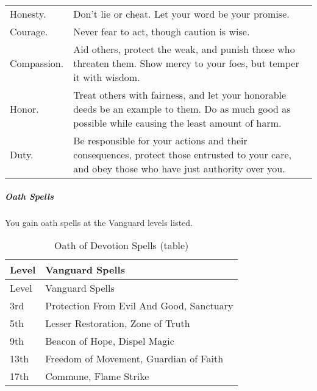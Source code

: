 \begin{longtable}[]{@{}
  >{\raggedright\arraybackslash}p{}
  >{\raggedright\arraybackslash}p{}@{}}
\toprule\noalign{}
\endhead
\bottomrule\noalign{}
\endlastfoot
Honesty. & Don't lie or cheat. Let your word be your promise. \\
Courage. & Never fear to act, though caution is wise. \\
Compassion. & Aid others, protect the weak, and punish those who
threaten them. Show mercy to your foes, but temper it with wisdom. \\
Honor. & Treat others with fairness, and let your honorable deeds be an
example to them. Do as much good as possible while causing the least
amount of harm. \\
Duty. & Be responsible for your actions and their consequences, protect
those entrusted to your care, and obey those who have just authority
over you. \\
\end{longtable}

\subparagraph{Oath Spells}\label{_oath_spells}

You gain oath spells at the Vanguard levels listed.

\begin{longtable}[]{@{}
  >{\raggedright\arraybackslash}p{}
  >{\raggedright\arraybackslash}p{}@{}}
\caption{Oath of Devotion Spells
(table)}\label{vanguard-oath-of-devotion-spells}\tabularnewline
\toprule\noalign{}
\begin{minipage}[b]{\linewidth}\raggedright
Level
\end{minipage} & \begin{minipage}[b]{\linewidth}\raggedright
Vanguard Spells
\end{minipage} \\
\midrule\noalign{}
\endfirsthead
\toprule\noalign{}
\begin{minipage}[b]{\linewidth}\raggedright
Level
\end{minipage} & \begin{minipage}[b]{\linewidth}\raggedright
Vanguard Spells
\end{minipage} \\
\midrule\noalign{}
\endhead
\bottomrule\noalign{}
\endlastfoot
3rd & Protection From Evil And Good, Sanctuary \\
5th & Lesser Restoration, Zone of Truth \\
9th & Beacon of Hope, Dispel Magic \\
13th & Freedom of Movement, Guardian of Faith \\
17th & Commune, Flame Strike \\
\end{longtable}


